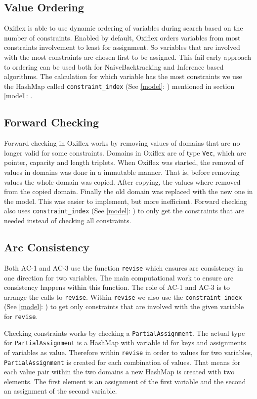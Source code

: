\subsection{Value Ordering}

Oxiflex is able to use dynamic ordering of variables during search based on the number of constraints. Enabled by default, Oxiflex orders variables from most constraints involvement to least for assignment. So variables that are involved with the most constraints are chosen first to be assigned. This fail early approach to ordering can be used both for NaiveBacktracking and Inference based algorithms. The calculation for which variable has the most constraints we use the HashMap called \verb|constraint_index| (See \ref{model}: ) mentioned in section \ref{model}: .

\subsection{Forward Checking}

Forward checking in Oxiflex works by removing values of domains that are no longer valid for some constraints. Domains in Oxiflex are of type \verb|Vec|, which are pointer, capacity and length triplets. When Oxiflex was started, the removal of values in domains was done in a immutable manner. That is, before removing values the whole domain was copied. After copying, the values where removed from the copied domain. Finally the old domain was replaced with the new one in the model. This was easier to implement, but more inefficient. Forward checking also uses \verb|constraint_index| (See \ref{model}: ) to only get the constraints that are needed instead of checking all constraints.

\subsection{Arc Consistency}

Both AC-1 and AC-3 use the function \verb|revise| which ensures arc consistency in one direction for two variables. The main computational work to ensure arc consistency happens within this function. The role of AC-1 and AC-3 is to arrange the calls to \verb|revise|. Within \verb|revise| we also use the \verb|constraint_index| (See \ref{model}: ) to get only constraints that are involved with the given variable for \verb|revise|.

Checking constraints works by checking a \verb|PartialAssignment|. The actual type for \verb|PartialAssignment| is a HashMap with variable id for keys and assignments of variables as value. Therefore within \verb|revise| in order to values for two variables, \verb|PartialAssignment| is created for each combination of values. That means for each value pair within the two domains a new HashMap is created with two elements. The first element is an assignment of the first variable and the second an assignment of the second variable.

